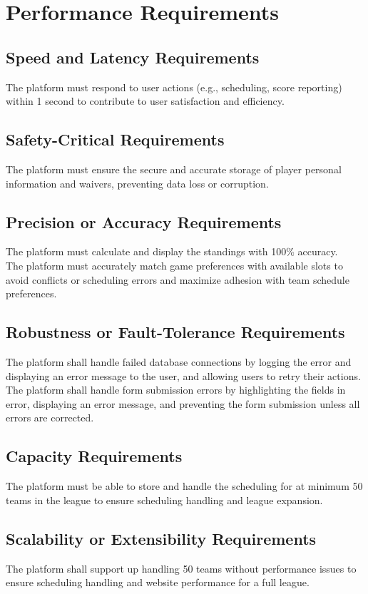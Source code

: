 \documentclass[12pt]{article}
\begin{document}
\section{Performance Requirements}
\subsection{Speed and Latency Requirements}
The platform must respond to user actions (e.g., scheduling, score reporting) within 1 second to contribute to user satisfaction and efficiency.

\subsection{Safety-Critical Requirements}
The platform must ensure the secure and accurate storage of player personal information and waivers, preventing data loss or corruption.

\subsection{Precision or Accuracy Requirements}
The platform must calculate and display the standings with 100\% accuracy.\\

\noindent The platform must accurately match game preferences with available slots to avoid conflicts or scheduling errors and maximize adhesion with team schedule preferences.

\subsection{Robustness or Fault-Tolerance Requirements}
The platform shall handle failed database connections by logging the error and displaying an error message to the user, and allowing users to retry their actions.
\noindent The platform shall handle form submission errors by highlighting the fields in error, displaying an error message, and preventing the form submission unless all errors are corrected.

\subsection{Capacity Requirements}
The platform must be able to store and handle the scheduling for at minimum 50 teams in the league to ensure scheduling handling and league expansion.

\subsection{Scalability or Extensibility Requirements}
The platform shall support up handling 50 teams without performance issues to ensure scheduling handling and website performance for a full league.
\end{document}
